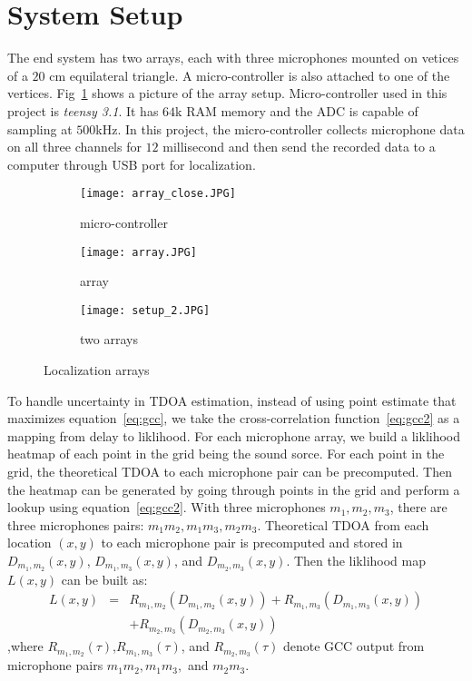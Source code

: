 \section{System Setup}
The end system has two arrays, each with three microphones mounted on vetices of a $20$ cm equilateral triangle. A micro-controller is also attached to one of the vertices. Fig~\ref{fig:setup_array} shows a picture of the array setup. Micro-controller used in this project is \emph{teensy 3.1}. It has $64$k RAM memory and the ADC is capable of sampling at $500$kHz. In this project, the micro-controller collects microphone data on all three channels for $12$ millisecond and then send the recorded data to a computer through USB port for localization. 

\begin{figure}[]
  \centering
  \begin{subfigure}[]{.23\textwidth}
    \texttt{[image: array\_close.JPG]}
    \caption{micro-controller}
  \end{subfigure}
  \begin{subfigure}[]{.23\textwidth}
    \texttt{[image: array.JPG]}
    \caption{array}
  \end{subfigure}
  \begin{subfigure}[]{.23\textwidth}
    \texttt{[image: setup\_2.JPG]}
    \caption{two arrays}
  \end{subfigure}
  \caption{Localization arrays}
  \label{fig:setup_array}
\end{figure}

To handle uncertainty in TDOA estimation, instead of using point estimate that maximizes equation~\ref{eq:gcc}, we take the cross-correlation function~\ref{eq:gcc2} as a mapping from delay to liklihood. For each microphone array, we build a liklihood heatmap of each point in the grid being the sound sorce. For each point in the grid, the theoretical TDOA to each microphone pair can be precomputed. Then the heatmap can be generated by going through points in the grid and perform a lookup using equation~\ref{eq:gcc2}. With three microphones $m_1,m_2,m_3$, there are three microphones pairs: $m_1m_2,m_1m_3,m_2m_3$. Theoretical TDOA from each location $(x,y)$ to each microphone pair is precomputed and stored in $D_{m_1,m_2}(x,y)$, $D_{m_1,m_3}(x,y)$, and $D_{m_2,m_3}(x,y)$. Then the liklihood map $L(x,y)$ can be built as:
\begin{eqnarray*}
  L(x,y) &=& R_{m_1,m_2}(D_{m_1,m_2}(x,y)) + R_{m_1,m_3}(D_{m_1,m_3}(x,y)) \\
 & & +R_{m_2,m_3}(D_{m_2,m_3}(x,y)) 
\end{eqnarray*}
,where $R_{m_1,m_2}(\tau)$,$R_{m_1,m_3}(\tau)$, and $R_{m_2,m_3}(\tau)$ denote GCC output from microphone pairs $m_1m_2,m_1m_3,$ and $m_2m_3$.

